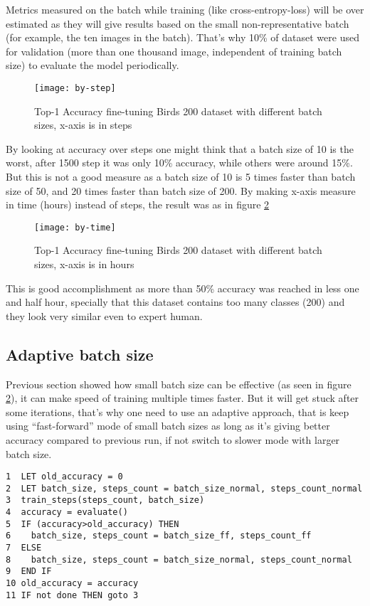 Metrics measured on the batch while training (like cross-entropy-loss)
will be over estimated as they will give results based on the small non-representative batch (for example, the ten images in the batch). 
That's why 10\% of dataset were used for validation (more than one thousand image, independent of training batch size) to evaluate the model periodically.

\begin{figure}[!h]
\centering
\texttt{[image: by-step]}
\caption{Top-1 Accuracy fine-tuning Birds 200 dataset with different batch sizes, x-axis is in steps}\label{fig:by-step}
\end{figure}

By looking at accuracy over steps one might think that a batch size of 10 is the worst,
after 1500 step it was only 10\% accuracy, while others were around 15\%.
But this is not a good measure as a batch size of 10 is 5 times faster than batch size of 50,
and 20 times faster than batch size of 200.
By making x-axis measure in time (hours) instead of steps, the result was as in figure \ref{fig:by-time}


\begin{figure}[!h]
\centering
\texttt{[image: by-time]}
\caption{Top-1 Accuracy fine-tuning Birds 200 dataset with different batch sizes, x-axis is in hours}\label{fig:by-time}
\end{figure}

This is good accomplishment as more than 50\% accuracy was reached in less one and half hour,
specially that this dataset contains too many classes (200) and they look very similar even to expert human.

\subsection{Adaptive batch size}

Previous section showed how small batch size can be effective (as seen in figure \ref{fig:by-time}),
it can make speed of training multiple times faster.
But it will get stuck after some iterations,
that's why one need to use an adaptive approach, that is keep using ``fast-forward'' mode of small batch sizes
as long as it's giving better accuracy compared to previous run,
if not switch to slower mode with larger batch size.


\begin{program}
\begin{verbatim}
1  LET old_accuracy = 0
2  LET batch_size, steps_count = batch_size_normal, steps_count_normal
3  train_steps(steps_count, batch_size)
4  accuracy = evaluate()
5  IF (accuracy>old_accuracy) THEN
6    batch_size, steps_count = batch_size_ff, steps_count_ff
7  ELSE
8    batch_size, steps_count = batch_size_normal, steps_count_normal
9  END IF
10 old_accuracy = accuracy
11 IF not done THEN goto 3
\end{verbatim}
\caption{adaptive batch size algorithm in pseudo code}
\end{program}

